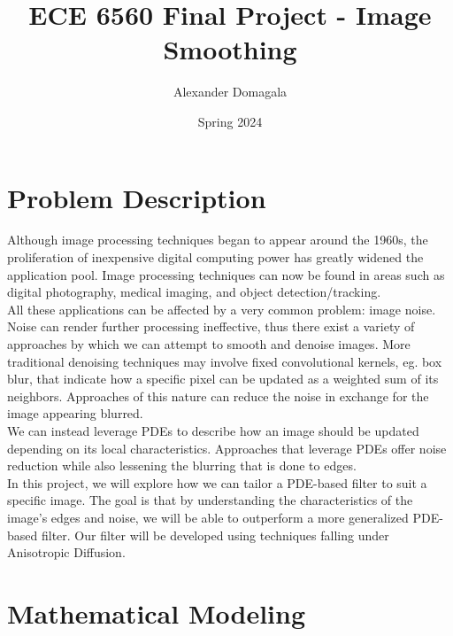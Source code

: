 \documentclass{article}
\title{\textbf{ECE 6560 Final Project - Image Smoothing}}
\author{Alexander Domagala}
\date{Spring 2024}
\begin{document}
  \maketitle

  \section{Problem Description}
  Although image processing techniques began to appear around the 1960s, the proliferation of inexpensive
  digital computing power has greatly widened the application pool. Image processing techniques
  can now be found in areas such as digital photography, medical imaging, and object detection/tracking.\\

  \noindent
  All these applications can be affected by a very common problem: image noise.
  Noise can render further processing ineffective, thus there exist a variety of approaches by which
  we can attempt to smooth and denoise images. More traditional denoising techniques
  may involve fixed convolutional kernels, eg. box blur\cite{boxBlur}, that indicate how a specific pixel
  can be updated as a weighted sum of its neighbors. Approaches of this nature can reduce the noise in
  exchange for the image appearing blurred.\\

  \noindent
  We can instead leverage PDEs to describe how an image should be updated depending on its local characteristics.
  Approaches that leverage PDEs offer noise reduction while also lessening the blurring that is done to edges.\\

  \noindent
  In this project, we will explore how we can tailor a PDE-based filter to suit a specific image.
  The goal is that by understanding the characteristics of the image's edges and noise, we
  will be able to outperform a more generalized PDE-based filter. Our filter will be developed
  using techniques falling under Anisotropic Diffusion.




  \newpage
  \section{Mathematical Modeling}
\end{document}
